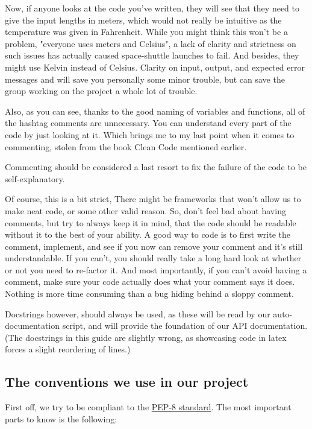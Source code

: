 \documentclass[10pt,a4paper]{article}
\begin{document}
Now, if anyone looks at the code you've written, they will see that they need to give the input lengths in meters, which would not really be intuitive as the temperature was given in Fahrenheit. While you might think this won't be a problem, "everyone uses meters and Celsius", a lack of clarity and strictness on such issues has actually caused space-shuttle launches to fail. And besides, they might use Kelvin instead of Celsius. Clarity on input, output, and expected error messages and will save you personally some minor trouble, but can save the group working on the project a whole lot of trouble. 

Also, as you can see, thanks to the good naming of variables and functions, all of the hashtag comments are unnecessary. You can understand every part of the code by just looking at it. Which brings me to my last point when it comes to commenting, stolen from the book Clean Code mentioned earlier.

Commenting should be considered a last resort to fix the failure of the code to be self-explanatory.

Of course, this is a bit strict, There might be frameworks that won't allow us to make neat code, or some other valid reason. So, don't feel bad about having comments, but try to always keep it in mind, that the code should be readable without it to the best of your ability. A good way to code is to first write the comment, implement, and see if you now can remove your comment and it's still understandable. If you can't, you should really take a long hard look at whether or not you need to re-factor it. And most importantly, if you can't avoid having a comment, make sure your code actually does what your comment says it does. Nothing is more time consuming than a bug hiding behind a sloppy comment. 

Docstrings however, should always be used, as these will be read by our auto-documentation script, and will provide the foundation of our API documentation. (The docstrings in this guide are slightly wrong, as showcasing code in latex forces a slight reordering of lines.)

\subsection{The conventions we use in our project}

First off, we try to be compliant to the \href{https://www.python.org/dev/peps/pep-0008/}{PEP-8 standard}. The most important parts to know is the following:
\end{document}
